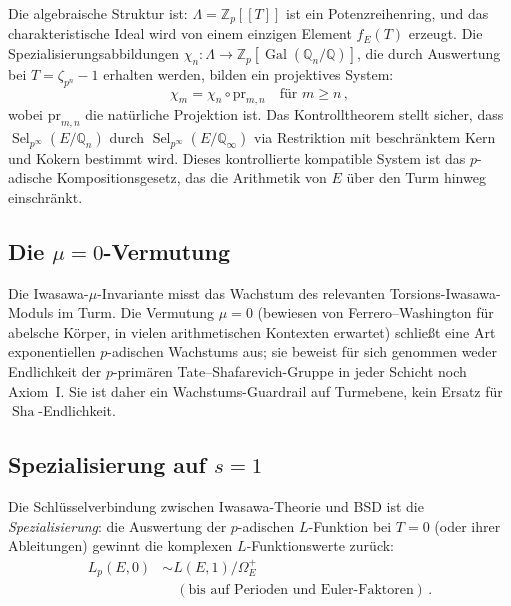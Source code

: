 \documentclass[aps,prd,twocolumn,superscriptaddress,nofootinbib,floatfix]{revtex4-2}
\theoremstyle{definition}
\theoremstyle{remark}
\DeclareMathOperator{\Sel}{Sel}
\DeclareMathOperator{\Sha}{Sha}
\DeclareMathOperator{\Gal}{Gal}
\begin{document}
Die algebraische Struktur ist: $\Lambda = \mathbb{Z}_p[[T]]$ ist ein Potenzreihenring, und das charakteristische Ideal wird von einem einzigen Element $f_E(T)$ erzeugt. Die Spezialisierungsabbildungen $\chi_n: \Lambda \to \mathbb{Z}_p[\Gal(\mathbb{Q}_n/\mathbb{Q})]$, die durch Auswertung bei $T = \zeta_{p^n} - 1$ erhalten werden, bilden ein projektives System:
\begin{equation}
\chi_m = \chi_n \circ \mathrm{pr}_{m,n} \quad \text{für } m \geq n\,,
\end{equation}
wobei $\mathrm{pr}_{m,n}$ die natürliche Projektion ist. Das Kontrolltheorem stellt sicher, dass $\Sel_{p^\infty}(E/\mathbb{Q}_n)$ durch $\Sel_{p^\infty}(E/\mathbb{Q}_\infty)$ via Restriktion mit beschränktem Kern und Kokern bestimmt wird. Dieses kontrollierte kompatible System ist das $p$-adische Kompositionsgesetz, das die Arithmetik von $E$ über den Turm hinweg einschränkt.

\subsection{\texorpdfstring{Die $\mu = 0$-Vermutung}{Die mu = 0-Vermutung}}

Die Iwasawa-$\mu$-Invariante misst das Wachstum des relevanten Torsions-Iwasawa-Moduls im Turm. Die Vermutung $\mu = 0$ (bewiesen von Ferrero--Washington für abelsche Körper, in vielen arithmetischen Kontexten erwartet) schließt eine Art exponentiellen $p$-adischen Wachstums aus; sie beweist für sich genommen weder Endlichkeit der $p$-primären Tate--Shafarevich-Gruppe in jeder Schicht noch Axiom~I. Sie ist daher ein Wachstums-Guardrail auf Turmebene, kein Ersatz für $\Sha$-Endlichkeit.

\subsection{\texorpdfstring{Spezialisierung auf $s = 1$}{Spezialisierung auf s = 1}}

Die Schlüsselverbindung zwischen Iwasawa-Theorie und BSD ist die \textit{Spezialisierung}: die Auswertung der $p$-adischen $L$-Funktion bei $T = 0$ (oder ihrer Ableitungen) gewinnt die komplexen $L$-Funktionswerte zurück:
\begin{equation}
\begin{aligned}
L_p(E, 0) &\sim L(E, 1)/\Omega_E^+ \\
&\quad (\text{bis auf Perioden und Euler-Faktoren})\,.
\end{aligned}
\end{equation}
\end{document}
